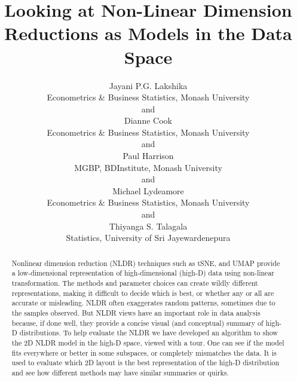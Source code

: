 \documentclass[
  12pt]{article}
\begin{document}
\def\spacingset#1{\renewcommand{\baselinestretch}%
{#1}\small\normalsize} \spacingset{1}



\title{\bf Looking at Non-Linear Dimension Reductions as Models in the
Data Space}
\author{
Jayani P.G. Lakshika\\
Econometrics \& Business Statistics, Monash University\\
and\\Dianne Cook\\
Econometrics \& Business Statistics, Monash University\\
and\\Paul Harrison\\
MGBP, BDInstitute, Monash University\\
and\\Michael Lydeamore\\
Econometrics \& Business Statistics, Monash University\\
and\\Thiyanga S. Talagala\\
Statistics, University of Sri Jayewardenepura\\
}
\maketitle

\bigskip
\bigskip
\begin{abstract}
Nonlinear dimension reduction (NLDR) techniques such as tSNE, and UMAP
provide a low-dimensional representation of high-dimensional (high-D)
data using non-linear transformation. The methods and parameter choices
can create wildly different representations, making it difficult to
decide which is best, or whether any or all are accurate or misleading.
NLDR often exaggerates random patterns, sometimes due to the samples
observed. But NLDR views have an important role in data analysis
because, if done well, they provide a concise visual (and conceptual)
summary of high-D distributions. To help evaluate the NLDR we have
developed an algorithm to show the 2D NLDR model in the high-D space,
viewed with a tour. One can see if the model fits everywhere or better
in some subspaces, or completely mismatches the data. It is used to
evaluate which 2D layout is the best representation of the high-D
distribution and see how different methods may have similar summaries or
quirks.
\end{abstract}
\end{document}
